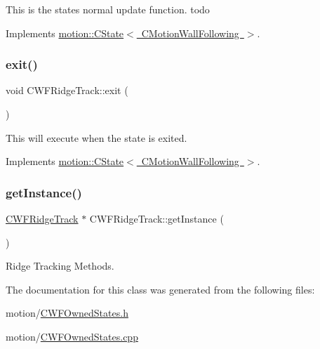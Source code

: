 This is the states normal update function. todo 

Implements \mbox{\hyperlink{classmotion_1_1CState_a71dc72d345b15bf3b5b5bff596a71f33}{motion\+::\+C\+State$<$ C\+Motion\+Wall\+Following $>$}}.

\mbox{\label{classmotion_1_1CWFRidgeTrack_a15ab958b412e2e6a70619822e6697f7f}} 
\subsubsection{\texorpdfstring{exit()}{exit()}}
{\footnotesize\ttfamily void C\+W\+F\+Ridge\+Track\+::exit (\begin{DoxyParamCaption}\item[{\mbox{\hyperlink{classmotion_1_1CMotionWallFollowing}{C\+Motion\+Wall\+Following}} $\ast$}]{ }\end{DoxyParamCaption})\hspace{0.3cm}{\ttfamily [virtual]}}

This will execute when the state is exited. 

Implements \mbox{\hyperlink{classmotion_1_1CState_a353db064c159d66b82bf257b35e7c016}{motion\+::\+C\+State$<$ C\+Motion\+Wall\+Following $>$}}.

\mbox{\label{classmotion_1_1CWFRidgeTrack_ad85de711d4ce2b59f3dca20d233d77ed}} 
\subsubsection{\texorpdfstring{get\+Instance()}{getInstance()}}
{\footnotesize\ttfamily \mbox{\hyperlink{classmotion_1_1CWFRidgeTrack}{C\+W\+F\+Ridge\+Track}} $\ast$ C\+W\+F\+Ridge\+Track\+::get\+Instance (\begin{DoxyParamCaption}\item[{void}]{ }\end{DoxyParamCaption})\hspace{0.3cm}{\ttfamily [static]}}

Ridge Tracking Methods. 

The documentation for this class was generated from the following files\+:\begin{DoxyCompactItemize}
\item 
motion/\mbox{\hyperlink{CWFOwnedStates_8h}{C\+W\+F\+Owned\+States.\+h}}\item 
motion/\mbox{\hyperlink{CWFOwnedStates_8cpp}{C\+W\+F\+Owned\+States.\+cpp}}\end{DoxyCompactItemize}
